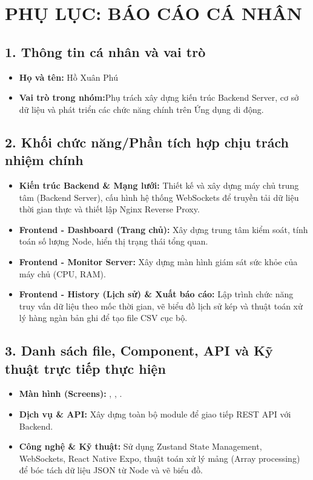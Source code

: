 \documentclass{article}
\begin{document}
\newpage
\section*{PHỤ LỤC: BÁO CÁO CÁ NHÂN}

\subsection*{1. Thông tin cá nhân và vai trò}
\begin{itemize}
    \item \textbf{Họ và tên:} Hồ Xuân Phú
    \item \textbf{Vai trò trong nhóm:}Phụ trách xây dựng kiến trúc Backend Server, cơ sở dữ liệu và phát triển các chức năng chính trên Ứng dụng di động.
\end{itemize}

\subsection*{2. Khối chức năng/Phần tích hợp chịu trách nhiệm chính}
\begin{itemize}
    \item \textbf{Kiến trúc Backend \& Mạng lưới:} Thiết kế và xây dựng máy chủ trung tâm (Backend Server), cấu hình hệ thống WebSockets để truyền tải dữ liệu thời gian thực và thiết lập Nginx Reverse Proxy.
    \item \textbf{Frontend - Dashboard (Trang chủ):} Xây dựng trung tâm kiểm soát, tính toán số lượng Node, hiển thị trạng thái tổng quan.
    \item \textbf{Frontend - Monitor Server:} Xây dựng màn hình giám sát sức khỏe của máy chủ (CPU, RAM).
    \item \textbf{Frontend - History (Lịch sử) \& Xuất báo cáo:} Lập trình chức năng truy vấn dữ liệu theo mốc thời gian, vẽ biểu đồ lịch sử kép và thuật toán xử lý hàng ngàn bản ghi để tạo file CSV cục bộ.
\end{itemize}

\subsection*{3. Danh sách file, Component, API và Kỹ thuật trực tiếp thực hiện}
\begin{itemize}
    \item \textbf{Màn hình (Screens):} , , .
    \item \textbf{Dịch vụ \& API:} Xây dựng toàn bộ module  để giao tiếp REST API với Backend.
    \item \textbf{Công nghệ \& Kỹ thuật:} Sử dụng Zustand State Management, WebSockets, React Native Expo, thuật toán xử lý mảng (Array processing) để bóc tách dữ liệu JSON từ Node và vẽ biểu đồ.
\end{itemize}
\end{document}
